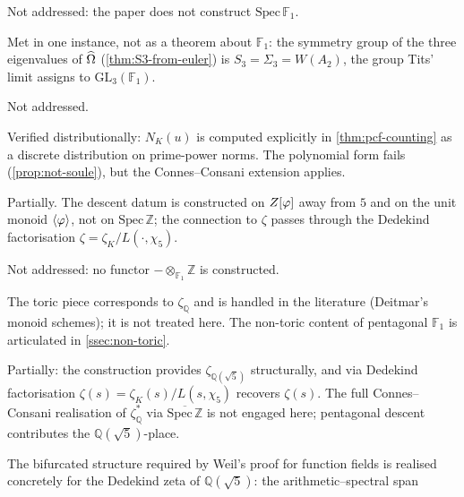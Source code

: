 \begin{description}[leftmargin=*,nosep]
\item[\ref{D1} ($\mathrm{Spec}\,\mathbb{F}_1$ a single point).]
  Not addressed: the paper does not construct $\mathrm{Spec}\,\mathbb{F}_1$.
\item[\ref{D2} ($\mathrm{GL}_n(\mathbb{F}_1) = \Sigma_n$).]
  Met in one instance, not as a theorem about $\mathbb F_1$: the symmetry group of the
  three eigenvalues of $\widehat{\Omega}$ \textup{(\cref{thm:S3-from-euler})} is
  $S_3=\Sigma_3=W(A_2)$, the group Tits' limit assigns to $\mathrm{GL}_3(\mathbb{F}_1)$.
\item[\ref{D3} ($\mathbb{P}^n(\mathbb{F}_1)$ has $n+1$ points).]
  Not addressed.
\item[\ref{D4} (counting function).]  Verified
  distributionally: $N_K(u)$ is computed explicitly in
  \cref{thm:pcf-counting} as a discrete distribution on
  prime-power norms.  The polynomial form fails
  \textup{(\cref{prop:not-soule})}, but the Connes--Consani
  extension applies.
\item[\ref{D5} ($\mathrm{Spec}\,\mathbb{Z}$ as $\mathbb{F}_1$-curve).]
  Partially.  The descent datum is constructed on $Z[\varphi]$ away from $5$ and on the
  unit monoid $\langle\varphi\rangle$, not on $\mathrm{Spec}\,\mathbb{Z}$; the connection
  to $\zeta$ passes through the Dedekind factorisation
  $\zeta = \zeta_K/L(\cdot,\chi_5)$.
\item[\ref{D6} (base-change functor).]  Not addressed: no functor
  $-\otimes_{\mathbb F_1}\mathbb Z$ is constructed.
\item[\ref{D7} (toric varieties).]
  The toric piece corresponds to $\zeta_\mathbb{Q}$ and is handled
  in the literature (Deitmar's monoid schemes); it is not treated here.  The non-toric content of pentagonal
  $\mathbb{F}_1$ is articulated in
  \cref{ssec:non-toric}.
\item[\ref{D8} (Riemann zeta from $\mathbb{F}_1$-counting).]
  Partially: the construction provides
  $\zeta_{\mathbb{Q}(\sqrt{5})}$ structurally, and via Dedekind
  factorisation $\zeta(s) = \zeta_K(s)/L(s,\chi_5)$ recovers
  $\zeta(s)$.  The full Connes--Consani realisation of
  $\zeta^*_\mathbb{Q}$ via $\overline{\mathrm{Spec}\,\mathbb{Z}}$
  is not engaged here; pentagonal descent contributes the
  $\mathbb{Q}(\sqrt{5})$-place.
\item[\ref{D9} (Weil-style proof of RH).]
  The bifurcated structure required by Weil's proof for function
  fields is realised concretely for the Dedekind zeta of
  $\mathbb{Q}(\sqrt{5})$: the arithmetic--spectral span

\end{description}
